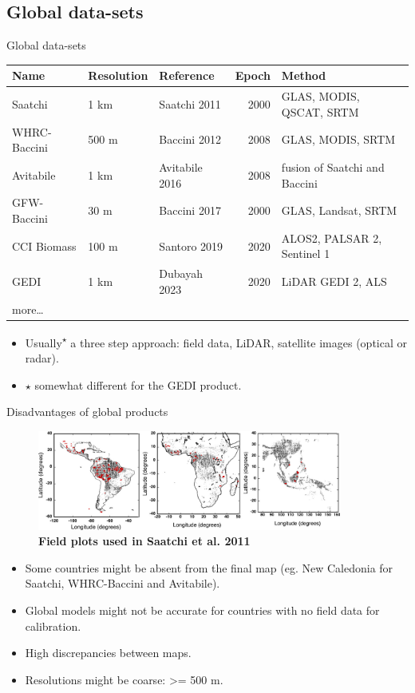 \documentclass[10pt,table,dvipsnames,compress]{beamer}
\begin{document}
\subsection{Global data-sets}
\label{sec:org6ed78b0}

\begin{frame}[label={sec:orgf9562a2}]{Global data-sets}
\begin{center}
\footnotesize
\begin{tabular}{lllrl}
Name & Resolution & Reference & Epoch & Method\\[0pt]
\hline
Saatchi & 1 km & Saatchi 2011 & 2000 & GLAS, MODIS, QSCAT, SRTM\\[0pt]
WHRC-Baccini & 500 m & Baccini 2012 & 2008 & GLAS, MODIS, SRTM\\[0pt]
Avitabile & 1 km & Avitabile 2016 & 2008 & fusion of Saatchi and Baccini\\[0pt]
GFW-Baccini & 30 m & Baccini 2017 & 2000 & GLAS, Landsat, SRTM\\[0pt]
CCI Biomass & 100 m & Santoro 2019 & 2020 & ALOS2, PALSAR 2, Sentinel 1\\[0pt]
GEDI & 1 km & Dubayah 2023 & 2020 & LiDAR GEDI 2, ALS\\[0pt]
more\ldots{} &  &  &  & \\[0pt]
\end{tabular}
\end{center}

\begin{itemize}
\item Usually\textsuperscript{\(\star\)} a three step approach: field data, LiDAR, satellite images (optical or radar).
\item \(\star\) somewhat different for the GEDI product.
\end{itemize}
\end{frame}

\begin{frame}[label={sec:orgc5dcf74}]{Disadvantages of global products}
\begin{figure}[htbp]
\centering
\includegraphics[width=10cm]{figs/carbon/data-saatchi.png}
\caption{\textbf{Field plots used in Saatchi et al. 2011}}
\end{figure}

\begin{itemize}
\item Some countries might be absent from the final map (eg. New Caledonia for Saatchi, WHRC-Baccini and Avitabile).
\item Global models might not be accurate for countries with no field data for calibration.
\item High discrepancies between maps.
\item Resolutions might be coarse: >= 500 m.
\end{itemize}
\end{frame}
\end{document}

